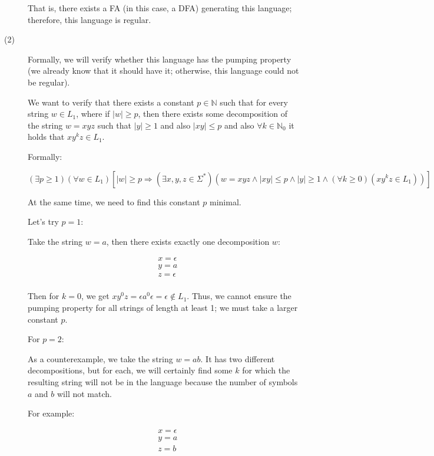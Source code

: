 \documentclass[10pt]{article}
\begin{document}
\begin{description}
That is, there exists a FA (in this case, a DFA) generating this language; therefore, this language is regular. 

\item[(2)]

Formally, we will verify whether this language has the pumping property (we already know that it should have it; otherwise, this language could not be regular).

We want to verify that there exists a constant $p \in \mathbb{N}$ such that for every string $w \in L_1$, where if $|w| \geq p$, then there exists some decomposition of the string $w = xyz$ such that $|y| \geq 1$ and also $|xy| \leq p$ and also $\forall k \in \mathbb{N}_{0}$ it holds that $xy^{k}z \in L_1$.

Formally:

$$(\exists p \geq 1)(\forall w \in L_1)[|w| \geq p \Rightarrow (\exists x, y, z \in \Sigma^{*})(w = xyz \land |xy| \leq p \land |y| \geq 1 \land (\forall k \geq 0)(xy^{k}z \in L_1))] $$

At the same time, we need to find this constant $p$ minimal.

Let's try $p = 1$:

Take the string $w = a$, then there exists exactly one decomposition $w$: 

\begin{align*}
& x = \epsilon \\
& y = a \\
& z = \epsilon \\
\end{align*}

Then for $k = 0$, we get $xy^{0}z = \epsilon a^{0} \epsilon = \epsilon \notin L_1$. Thus, we cannot ensure the pumping property for all strings of length at least 1; we must take a larger constant $p$.

For $p = 2$:

As a counterexample, we take the string $w = ab$. It has two different decompositions, but for each, we will certainly find some $k$ for which the resulting string will not be in the language because the number of symbols $a$ and $b$ will not match.

For example:

\begin{align*}
& x = \epsilon \\
& y = a \\
& z = b \\
\end{align*}


\end{description}
\end{document}
